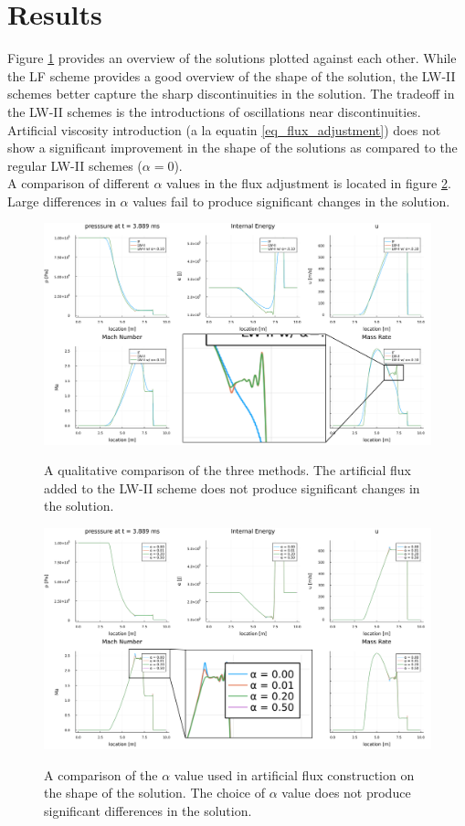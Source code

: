 \documentclass{article}
\begin{document}
\section{Results}

Figure \ref{fig_method_compare} provides an overview of the solutions plotted against each other. While the LF scheme
provides a good overview of the shape of the solution, the LW-II schemes better capture the sharp discontinuities
in the solution. The tradeoff in the LW-II schemes is the introductions of oscillations near discontinuities. Artificial
viscosity introduction (a la equatin \ref{eq_flux_adjustment}) does not show a significant improvement in the
shape of the solutions as compared to the regular LW-II schemes ($\alpha = 0$).\\

A comparison of different $\alpha$ values in the flux adjustment is located in figure \ref{fig_alpha_compare}. Large
differences in $\alpha$ values fail to produce significant changes in the solution.

\begin{figure}[H]
	\centering
	\includegraphics[width=\textwidth]{./figs/method_compare_nice.png}
	\label{fig_method_compare}
	\caption{A qualitative comparison of the three methods. The artificial flux added to the LW-II scheme
		does not produce significant changes in the solution.
	}
\end{figure}

\begin{figure}[H]
	\centering
	\includegraphics[width=\textwidth]{./figs/alpha_compare_nice.png}
	\label{fig_alpha_compare}
	\caption{A comparison of the $\alpha$ value used in artificial flux construction on the shape of the solution.
		The choice of $\alpha$ value does not produce significant differences in the solution.
	}
\end{figure}
\end{document}
